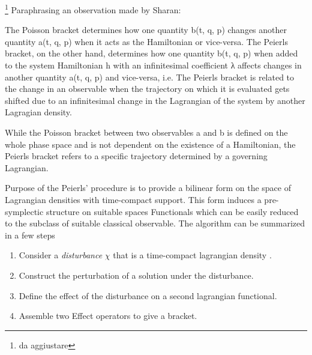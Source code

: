\documentclass[Main]{subfiles}
\begin{document}
	\begin{observation}
	\danger\footnote{da aggiustare} Paraphrasing an observation made by Sharan\cite{Sharan2010}:
	
	The Poisson bracket determines how one quantity b(t, q, p) changes another quantity a(t, q, p) when it acts as the Hamiltonian or vice-versa. The Peierls bracket, on the other hand, determines how one quantity b(t, q, p) when added to the system Hamiltonian h with an infinitesimal coefficient λ affects changes in another quantity a(t, q, p) and vice-versa, i.e. 	The Peierls bracket is related to the change in an observable when the trajectory on which it is evaluated gets shifted due to an infinitesimal change in the Lagrangian of the system by another Lagragian density.
		
	While the Poisson bracket between two observables a and b is defined on the whole phase space and is not dependent on the existence of a Hamiltonian, the Peierls bracket refers to a specific trajectory determined by a governing Lagrangian. 
	\end{observation}

	Purpose of the Peierls' procedure is to provide a bilinear form on the space of Lagrangian densities with time-compact support.
	This form induces a pre-symplectic structure on suitable spaces Functionals which can be easily reduced to the subclass of suitable classical observable.
	The algorithm can be summarized in a few steps
	\begin{enumerate}
		\item Consider a \emph{disturbance} $\chi$ that is a time-compact lagrangian density .
		\item Construct the perturbation of a solution under the disturbance.
		\item Define the effect of the disturbance on a second lagrangian functional.
		\item Assemble two Effect operators to give a bracket.
	\end{enumerate}
\end{document}
